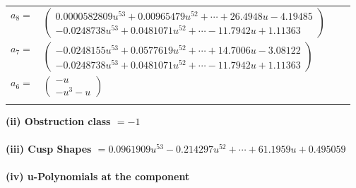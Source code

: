 \documentclass[1p]{elsarticle_modified}
\theoremstyle{definition}
\begin{document}
\begin{tabular}{m{7pt} m{180pt} m{7pt} m{180pt} }
\flushright $a_{8}=$&$\begin{pmatrix}0.0000582809 u^{53}+0.00965479 u^{52}+\cdots+26.4948 u-4.19485\\-0.0248738 u^{53}+0.0481071 u^{52}+\cdots-11.7942 u+1.11363\end{pmatrix}$ \\
\flushright $a_{7}=$&$\begin{pmatrix}-0.0248155 u^{53}+0.0577619 u^{52}+\cdots+14.7006 u-3.08122\\-0.0248738 u^{53}+0.0481071 u^{52}+\cdots-11.7942 u+1.11363\end{pmatrix}$ \\
\flushright $a_{6}=$&$\begin{pmatrix}- u\\- u^3- u\end{pmatrix}$\\&\end{tabular}
\flushleft \textbf{(ii) Obstruction class $= -1$}\\~\\
\flushleft \textbf{(iii) Cusp Shapes $= 0.0961909 u^{53}-0.214297 u^{52}+\cdots+61.1959 u+0.495059$}\\~\\
\newpage\renewcommand{\arraystretch}{1}
\flushleft \textbf{(iv) u-Polynomials at the component}\newline \\
\end{document}
